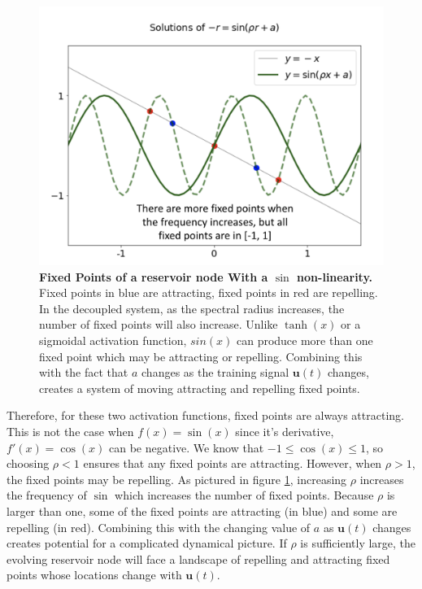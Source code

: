 \documentclass[journal]{journal}
\begin{document}
\begin{figure}[h] \label{sin}
\centering
\includegraphics[scale=0.4]{Images/sinfixed.png}
\caption{\textbf{Fixed Points of a reservoir node With a $\sin$ non-linearity.} Fixed points in blue are attracting, fixed points in red are repelling. In the decoupled system, as the spectral radius increases, the number of fixed points will also increase.  Unlike $\tanh(x)$ or a sigmoidal activation function, $sin(x)$ can produce more than one fixed point which may be attracting or repelling. Combining this with the fact that $a$ changes as the training signal $\mathbf{u}(t)$ changes, creates a system of moving attracting and repelling fixed points.}
\end{figure}

Therefore, for these two activation functions, fixed points are always attracting. This is not the case when $f(x) = \sin(x)$ since it's derivative, $f'(x) = \cos(x)$ can be negative. We know that $-1 \leq \cos(x) \leq 1$, so choosing $\rho < 1$ ensures that any fixed points are attracting. However, when $\rho > 1$, the fixed points may be repelling. As pictured in figure \ref{sin}, increasing $\rho$ increases the frequency of $\sin$ which increases the number of fixed points. Because $\rho$ is larger than one, some of the fixed points are attracting (in blue) and some are repelling (in red). Combining this with the changing value of $a$ as $\mathbf{u}(t)$ changes creates potential for a complicated dynamical picture. If $\rho$ is sufficiently large, the evolving reservoir node will face a  landscape of repelling and attracting fixed points whose locations change with $\mathbf{u}(t)$. 
\end{document}
